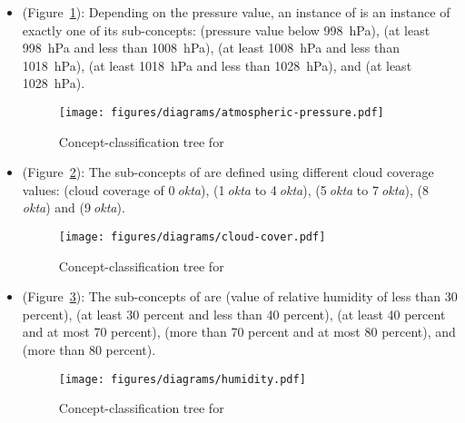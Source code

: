\begin{itemize}
  \item {} (Figure~\ref{fig:tree_atmospheric_pressure}): Depending on the pressure value, an instance of  is an instance of exactly one of its sub-concepts:  (pressure value below \SI{998}{\hecto\pascal}),  (at least \SI{998}{\hecto\pascal} and less than \SI{1008}{\hecto\pascal}),  (at least \SI{1008}{\hecto\pascal} and less than \SI{1018}{\hecto\pascal}),  (at least \SI{1018}{\hecto\pascal} and less than \SI{1028}{\hecto\pascal}), and  (at least \SI{1028}{\hecto\pascal}).
  
  \begin{figure}
    \centering
    \texttt{[image: figures/diagrams/atmospheric-pressure.pdf]}
    \caption{Concept-classification tree for }
    \label{fig:tree_atmospheric_pressure}
  \end{figure}

  \item {} (Figure~\ref{fig:tree_cloud_cover}): The sub-concepts of  are defined using different cloud coverage values:  (cloud coverage of \num{0}$\:$\emph{okta}),  (\num{1}$\:$\emph{okta} to \num{4}$\:$\emph{okta}),  (\num{5}$\:$\emph{okta} to \num{7}$\:$\emph{okta}),  (\num{8}$\:$\emph{okta}) and  (\num{9}$\:$\emph{okta}).
  
  \begin{figure}
    \centering
    \texttt{[image: figures/diagrams/cloud-cover.pdf]}
    \caption{Concept-classification tree for }
    \label{fig:tree_cloud_cover}
  \end{figure}

  \item {} (Figure~\ref{fig:tree_humidity}): The sub-concepts of  are  (value of relative humidity of less than \num{30} percent),  (at least \num{30} percent and less than \num{40} percent),  (at least \num{40} percent and at most \num{70} percent),  (more than \num{70} percent and at most \num{80} percent), and  (more than \num{80} percent).
  
  \begin{figure}
    \centering
    \texttt{[image: figures/diagrams/humidity.pdf]}
    \caption{Concept-classification tree for }
    \label{fig:tree_humidity}
  \end{figure}


\end{itemize}
